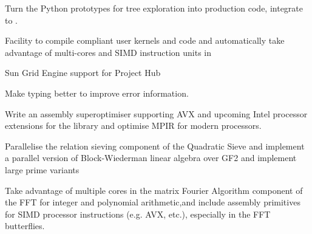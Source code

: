\begin{workpackage}
\begin{wpdelivs}
  \begin{wpdeliv}[due=3,miles=startup,id=sage-paral-tree,dissem=PU,nature=DEM,lead=PS,issue=107]
      {Turn the Python prototypes for tree exploration into production code, integrate to \Sage.}
\end{wpdeliv}
  \begin{wpdeliv}[due=18,miles=startup,id=pythran-sage,dissem=PU,nature=DEM,lead=UJF,issue=115]
      {Facility to compile \Pythran compliant user kernels and \Sage code and automatically
       take advantage of multi-cores and SIMD instruction units in \Cython}
  \end{wpdeliv}
  \begin{wpdeliv}[due=12,miles=startup,id=SGE-jupyter,dissem=PU,nature=OTHER,lead=USH,issue=116]
      {Sun Grid Engine support for Project \Jupyter Hub}
  \end{wpdeliv}
  \begin{wpdeliv}[due=18,miles=startup,id=pythran-typing,dissem=PU,nature=DEM, lead=LL,issue=117]
      {Make \Pythran typing better to improve error information.}
  \end{wpdeliv}
  \begin{wpdeliv}[due=18,miles=proto1,id=MPIRsuperoptimiser,dissem=PU,nature=DEM,lead=UK,issue=118]
      {Write an assembly superoptimiser supporting AVX and upcoming Intel processor extensions for the \MPIR library and optimise MPIR for modern processors.}
\end{wpdeliv}
  \begin{wpdeliv}[due=18,miles=proto1,id=QS-linalg,dissem=PU,nature=DEM,lead=UK,issue=119]
      { Parallelise the relation sieving component of the Quadratic Sieve and implement a parallel version of Block-Wiederman linear algebra over GF2 and implement large prime variants}
  \end{wpdeliv}
  \begin{wpdeliv}[due=18,miles=proto1,id=FFT,dissem=PU,nature=DEM, lead=UK,issue=120]
    {Take advantage of multiple cores in the matrix Fourier Algorithm component of the FFT for integer and polynomial arithmetic,and include assembly primitives for SIMD processor instructions (e.g. AVX, etc.), especially in the FFT butterflies.}
\end{wpdeliv}

\end{wpdelivs}
\end{workpackage}
